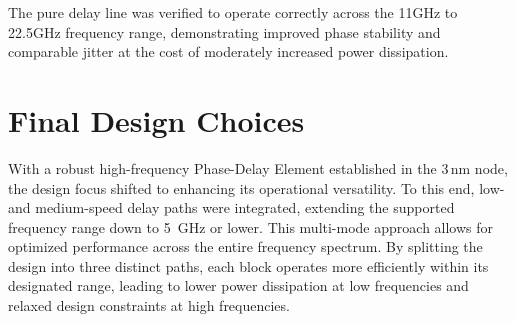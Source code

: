 The pure delay line was verified to operate correctly across the 11GHz to 22.5GHz frequency range, demonstrating improved phase stability and comparable jitter at the cost of moderately increased power dissipation.

\section{Final Design Choices}\label{sec:mixF_design}
With a robust high-frequency Phase-Delay Element established in the 3\,nm node, the design focus shifted to enhancing its operational versatility. To this end, low- and medium-speed delay paths were integrated, extending the supported frequency range down to 5~GHz or lower. This multi-mode approach allows for optimized performance across the entire frequency spectrum. By splitting the design into three distinct paths, each block operates more efficiently within its designated range, leading to lower power dissipation at low frequencies and relaxed design constraints at high frequencies.


